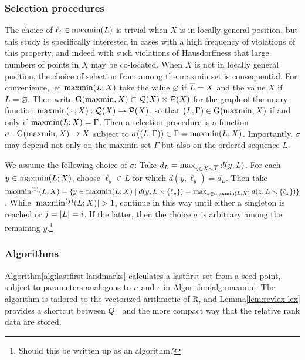 \documentclass[
]{article}
\begin{document}
\hypertarget{selection-procedures}{%
\subsubsection{Selection procedures}\label{selection-procedures}}

The choice of \(\ell_i \in \operatorname{maxmin}(L)\) is trivial when \(X\) is in
locally general position, but this study is specifically interested in
cases with a high frequency of violations of this property, and indeed
with such violations of Hausdorffness that large numbers of points in
\(X\) may be co-located. When \(X\) is not in locally general position,
the choice of selection from among the maxmin set is consequential. For
convenience, let \(\operatorname{maxmin}(L;X)\) take the value \(\varnothing\) if
\(\overline{L}=X\) and the value \(X\) if \(L=\varnothing\). Then write
\(\operatorname{G}(\operatorname{maxmin}, X) \subset \mathcal{Q}(X) \times \mathcal{P}(X)\) for the graph
of the unary function \(\operatorname{maxmin}(\,\cdot\,;X): \mathcal{Q}(X) \to \mathcal{P}(X)\),
so that \((L,\Gamma) \in \operatorname{G}(\operatorname{maxmin}, X)\) if and only if
\(\operatorname{maxmin}(L;X) = \Gamma\). Then a selection procedure is a function
\(\sigma: \operatorname{G}(\operatorname{maxmin}, X) \to X\) subject to
\(\sigma((L,\Gamma)) \in \Gamma = \operatorname{maxmin}(L;X)\). Importantly,
\(\sigma\) may depend not only on the maxmin set \(\Gamma\) but also on
the ordered sequence \(L\).

We assume the following choice of \(\sigma\): Take
\(d_L = \max_{y \in X \smallsetminus \overline{L}}{d(y,L)}\). For each
\(y \in \operatorname{maxmin}(L;X)\), choose \(\ell_y \in L\) for which
\(d(y,\ell_y) = d_L\). Then take
\(\operatorname{maxmin}^{(1)}(L;X) = \{y \in \operatorname{maxmin}(L;X) \mid d(y,L \smallsetminus \{\ell_y\}) = \max_{z \in \operatorname{maxmin}(L;X)}{d(z,L \smallsetminus \{\ell_z\})}\}\).
While \(\lvert \operatorname{maxmin}^{(j)}(L;X)\rvert > 1\), continue in this way until
either a singleton is reached or \(j=\lvert L\rvert=i\). If the latter, then
the choice \(\sigma\) is arbitrary among the remaining \(y\).\footnote{Should
  this be written up as an algorithm?}

\hypertarget{algorithms}{%
\subsubsection{Algorithms}\label{algorithms}}

Algorithm\nbs\ref{alg:lastfirst-landmarks} calculates a lastfirst set
from a seed point, subject to parameters analogous to \(n\) and
\(\epsilon\) in Algorithm\nbs\ref{alg:maxmin}. The algorithm is tailored
to the vectorized arithmetic of R, and Lemma\nbs\ref{lem:revlex-lex}
provides a shortcut between \(Q^-\) and the more compact way that the
relative rank data are stored.
\end{document}
